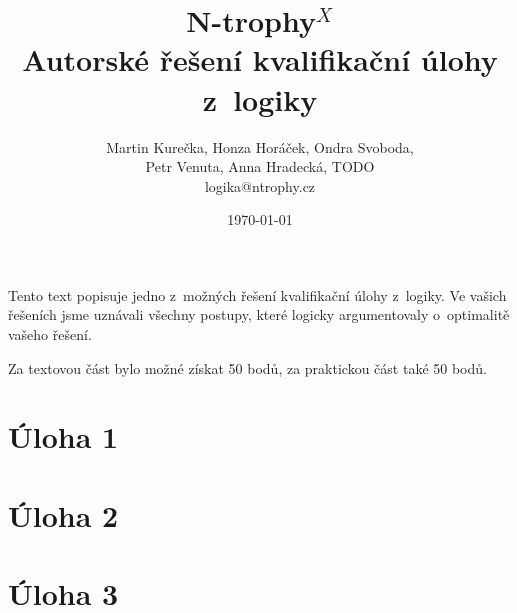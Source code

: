 \documentclass[12pt,a4paper]{article}
\begin{document}
\pagestyle{fancy}
\setcounter{page}{1}


\title{N-trophy$^X$\\Autorské řešení kvalifikační úlohy z~logiky}
\date{\today}
\author{Martin Kurečka, Honza Horáček, Ondra Svoboda, \\ Petr Venuta, Anna Hradecká, TODO \\
logika@ntrophy.cz}
\maketitle

Tento text popisuje jedno z~možných řešení kvalifikační úlohy z~logiky. Ve
vašich řešeních jsme uznávali všechny postupy, které logicky argumentovaly
o~optimalitě vašeho řešení.

Za textovou část bylo možné získat 50 bodů, za praktickou část také 50 bodů.

\section{Úloha 1}

\section{Úloha 2}

\section{Úloha 3}
\end{document}

